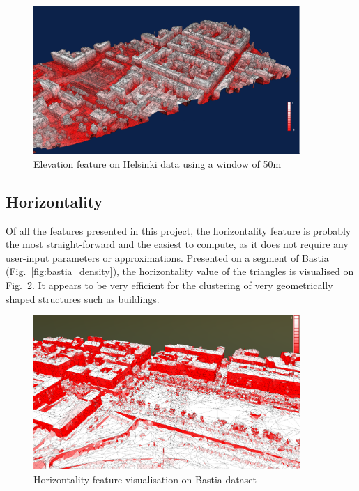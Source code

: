 \documentclass{kththesis}
\begin{document}
\begin{figure}[H]
    \centering
    \includegraphics[width=0.9\textwidth]{images/features/elevation_50_Helsinki.png}
    \caption{Elevation feature on Helsinki data using a window of 50m}
    \label{fig:elev_Helsinki}
\end{figure}
\subsection{Horizontality}
Of all the features presented in this project, the horizontality feature is probably the most straight-forward and the easiest to compute, as it does not require any user-input parameters or approximations. Presented on a segment of Bastia (Fig.~\ref{fig:bastia_density}), the horizontality value of the triangles is visualised on Fig.~\ref{fig:bastia_horizontality}. It appears to be very efficient for the clustering of very geometrically shaped structures such as buildings. 


\begin{figure}[H]
    \centering
    \includegraphics[width=0.9\textwidth]{images/features/horizontality_bastia.png}
    \caption{Horizontality feature visualisation on Bastia dataset}
    \label{fig:bastia_horizontality}
\end{figure}
\end{document}
